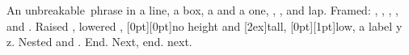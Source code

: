 \documentclass{article}
\begin{document}
An \mbox{unbreakable phrase} in a line, a  box, a  and a
 one, , , 
and lap. Framed: , , ,
,  and .
Raised , lowered , \raisebox{1ex}[0pt][0pt]{no height} and
\raisebox{0pt}[2ex]{tall}, \raisebox{-1ex}[0pt][1pt]{low}, a label \label{lb}\mbox{y} z. Nested  and \mbox{}. End.\mbox{} Next,
end. next.
\end{document}
